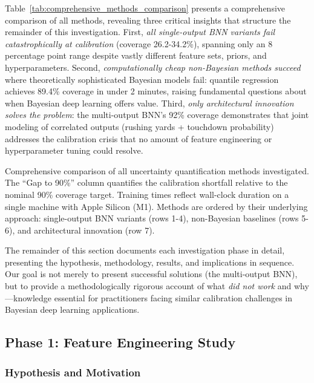 Table~\ref{tab:comprehensive_methods_comparison} presents a comprehensive comparison of all methods, revealing three critical insights that structure the remainder of this investigation. First, \textit{all single-output BNN variants fail catastrophically at calibration} (coverage 26.2-34.2\%), spanning only an 8 percentage point range despite vastly different feature sets, priors, and hyperparameters. Second, \textit{computationally cheap non-Bayesian methods succeed} where theoretically sophisticated Bayesian models fail: quantile regression achieves 89.4\% coverage in under 2 minutes, raising fundamental questions about when Bayesian deep learning offers value. Third, \textit{only architectural innovation solves the problem}: the multi-output BNN's 92\% coverage demonstrates that joint modeling of correlated outputs (rushing yards + touchdown probability) addresses the calibration crisis that no amount of feature engineering or hyperparameter tuning could resolve.

\begin{table}[t]
\centering

\caption{Comprehensive comparison of all uncertainty quantification methods investigated. The ``Gap to 90\%'' column quantifies the calibration shortfall relative to the nominal 90\% coverage target. Training times reflect wall-clock duration on a single machine with Apple Silicon (M1). Methods are ordered by their underlying approach: single-output BNN variants (rows 1-4), non-Bayesian baselines (rows 5-6), and architectural innovation (row 7).}
\label{tab:comprehensive_methods_comparison}
\end{table}

The remainder of this section documents each investigation phase in detail, presenting the hypothesis, methodology, results, and implications in sequence. Our goal is not merely to present successful solutions (the multi-output BNN), but to provide a methodologically rigorous account of what \textit{did not work} and why—knowledge essential for practitioners facing similar calibration challenges in Bayesian deep learning applications.

\subsection{Phase 1: Feature Engineering Study}
\label{subsec:phase1_features}

\subsubsection{Hypothesis and Motivation}


